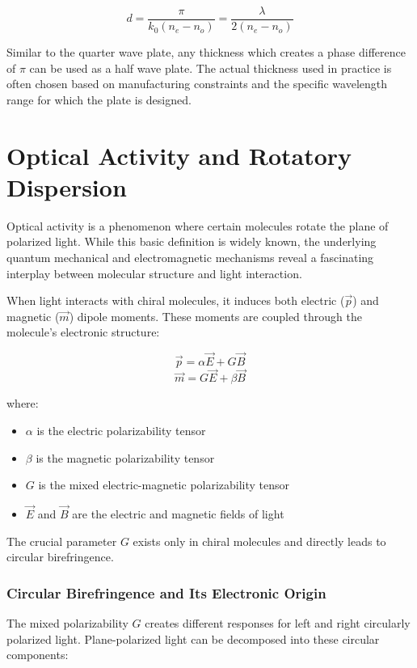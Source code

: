 \documentclass[
  a4paper,
]{book}
\providecommand{\tightlist}{%
  \setlength{\itemsep}{0pt}\setlength{\parskip}{0pt}}
\begin{document}
\[
d=\frac{\pi}{k_0(n_e-n_o)}=\frac{\lambda}{2(n_e-n_o)}
\]

Similar to the quarter wave plate, any thickness which creates a phase
difference of \(\pi\) can be used as a half wave plate. The actual
thickness used in practice is often chosen based on manufacturing
constraints and the specific wavelength range for which the plate is
designed.

\chapter{Optical Activity and Rotatory
Dispersion}\label{optical-activity-and-rotatory-dispersion}

Optical activity is a phenomenon where certain molecules rotate the
plane of polarized light. While this basic definition is widely known,
the underlying quantum mechanical and electromagnetic mechanisms reveal
a fascinating interplay between molecular structure and light
interaction.

When light interacts with chiral molecules, it induces both electric
(\(\vec{p}\)) and magnetic (\(\vec{m}\)) dipole moments. These moments
are coupled through the molecule's electronic structure:

\[\vec{p} = \alpha \vec{E} + G\vec{B}\]
\[\vec{m} = G\vec{E} + \beta \vec{B}\]

where:

\begin{itemize}
\tightlist
\item
  \(\alpha\) is the electric polarizability tensor
\item
  \(\beta\) is the magnetic polarizability tensor
\item
  \(G\) is the mixed electric-magnetic polarizability tensor
\item
  \(\vec{E}\) and \(\vec{B}\) are the electric and magnetic fields of
  light
\end{itemize}

The crucial parameter \(G\) exists only in chiral molecules and directly
leads to circular birefringence.

\subsection{Circular Birefringence and Its Electronic
Origin}\label{circular-birefringence-and-its-electronic-origin}

The mixed polarizability \(G\) creates different responses for left and
right circularly polarized light. Plane-polarized light can be
decomposed into these circular components:
\end{document}
